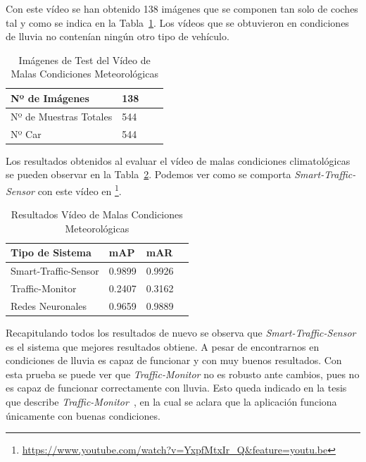 Con este vídeo se han obtenido 138 imágenes que se componen tan solo de coches tal y como se indica en la Tabla~\ref{tabla_video_malas_condiciones}. Los vídeos que se obtuvieron en condiciones de lluvia no contenían ningún otro tipo de vehículo.

\begin{table}[H] 
\begin{center}
\begin{tabular}{|l|l|l|l|}
\hline
Nº de Imágenes  & 138 \\
\hline \hline
Nº de Muestras Totales & 544\\ \hline
Nº Car & 544 \\ \hline
\end{tabular}
\caption{Imágenes de Test del Vídeo de Malas Condiciones Meteorológicas}
\label{tabla_video_malas_condiciones}
\end{center}
\end{table}

Los resultados obtenidos al evaluar el vídeo de malas condiciones climatológicas se pueden observar en la Tabla~\ref{resultados_video_malas_condiciones}. Podemos ver como se comporta \textit{Smart-Traffic-Sensor} con este vídeo en \footnote{\url{https://www.youtube.com/watch?v=YxpfMtxIr_Q&feature=youtu.be}}.

\begin{table}[H] 
\begin{center}
\begin{tabular}{|l|l|l|l|}
\hline
Tipo de Sistema & mAP & mAR  \\ 
\hline \hline
Smart-Traffic-Sensor & 0.9899 & 0.9926 \\ \hline
Traffic-Monitor & 0.2407 & 0.3162 \\ \hline
Redes Neuronales & 0.9659 & 0.9889\\ \hline
\end{tabular}
\caption{Resultados Vídeo de Malas Condiciones Meteorológicas}
\label{resultados_video_malas_condiciones}
\end{center}
\end{table}

Recapitulando todos los resultados de nuevo se observa que \textit{Smart-Traffic-Sensor} es el sistema que mejores resultados obtiene. A pesar de encontrarnos en condiciones de lluvia es capaz de funcionar y con muy buenos resultados. Con esta prueba se puede ver que \textit{Traffic-Monitor} no es robusto ante cambios, pues no es capaz de funcionar correctamente con lluvia. Esto queda indicado en la tesis que describe \textit{Traffic-Monitor}~\cite{redo_tesis}, en la cual se aclara que la aplicación funciona únicamente con buenas condiciones.

